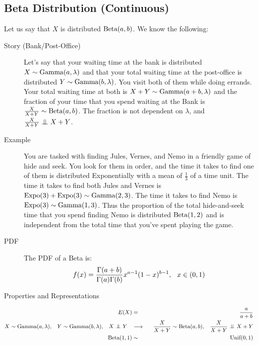 \documentclass[11.5pt]{article}
\begin{document}
\begin{notes}
\section*{Beta Distribution (Continuous)}
Let us say that $X$ is distributed $\textrm{Beta}(a, b)$. We know the following:
\begin{description}
	\item[Story (Bank/Post-Office)] Let's say that your waiting time at the bank is distributed $X \sim \textrm{Gamma}(a, \lambda)$ and that your total waiting time at the post-office is distributed $Y \sim \textrm{Gamma}(b, \lambda)$. You visit both of them while doing errands. Your total waiting time at both is $X + Y \sim \textrm{Gamma}(a + b, \lambda)$ and the fraction of your time that you spend waiting at the Bank is $\frac{X}{X+Y} \sim \textrm{Beta}(a, b)$. The fraction is not dependent on $\lambda$, and $\frac{X}{X+Y} \independent X + Y$.
	\item[Example] You are tasked with finding Jules, Vernes, and Nemo in a friendly game of hide and seek. You look for them in order, and the time it takes to find one of them is distributed Exponentially with a mean of $\frac{1}{3}$ of a time unit. The time it takes to find both Jules and Vernes is $\textrm{Expo}(3) + \textrm{Expo}(3) \sim \textrm{Gamma}(2, 3)$. The time it takes to find Nemo is $\textrm{Expo}(3) \sim \textrm{Gamma}(1, 3)$. Thus the proportion of the total hide-and-seek time that you spend finding Nemo is distributed $\textrm{Beta}(1, 2)$ and is independent from the total time that you've spent playing the game.
	\item[PDF] The PDF of a Beta is:
		\begin{eqnarray*}
		f(x) = \frac{\Gamma(a+b)}{\Gamma(a)\Gamma(b)}x^{a-1}(1-x)^{b-1},
		\hspace{.1 in}
		x \in (0, 1)
		\end{eqnarray*}
	\item[Properties and Representations]
\end{description}
\vspace{-.4 cm}
	\begin{eqnarray*}
		E(X) &=& \frac{a}{a + b} \\
		X \sim \Gam(a, \lambda), \hspace{.3cm} Y \sim \Gam(b, \lambda), \hspace{.3cm} X\independent Y \hspace{.3cm} &\longrightarrow& \hspace{.3cm} \frac{X}{X + Y} \sim \Beta(a, b), \hspace{.3cm} \frac{X}{X + Y} \independent X + Y \\
		\Beta(1, 1) &\sim& \Unif(0, 1)
	\end{eqnarray*}


\end{notes}
\end{document}
